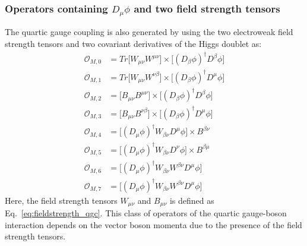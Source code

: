 \subsubsection{Operators containing $D_{\mu}\phi$ and two field strength tensors} %
\label{ssub:operators_containing_}
The quartic gauge coupling is also generated by using the two electroweak field strength tensors and two covariant derivatives of the Higgs doublet as:
\begin{align}
\mathcal{O}_{M,0} &=Tr\Big[W_{\mu\nu}W^{\mu\nu}\Big]\times \Big[(D_{\beta}\phi)^{\dagger}D^{\beta}\phi\Big] \\
\mathcal{O}_{M,1} &=Tr\Big[W_{\mu\nu}W^{\nu\beta}\Big]\times \Big[(D_{\beta}\phi)^{\dagger}D^{\mu}\phi\Big]\\
\mathcal{O}_{M,2} &=\Big[B_{\mu\nu}B^{\mu\nu}\Big]\times \Big[(D_{\beta}\phi)^{\dagger}D^{\beta}\phi\Big]\\
\mathcal{O}_{M,3} &=\Big[B_{\mu\nu}B^{\nu\beta}\Big]\times \Big[(D_{\beta}\phi)^{\dagger}D^{\mu}\phi\Big]\\
\mathcal{O}_{M,4} &=\Big[(D_{\mu}\phi)^{\dagger}W_{\beta\nu}D^{\mu}\phi\Big]\times B^{\beta\nu}\\
\mathcal{O}_{M,5} &=\Big[(D_{\mu}\phi)^{\dagger}W_{\beta\nu}D^{\nu}\phi\Big]\times B^{\beta\mu}\\
\mathcal{O}_{M,6} &=\Big[(D_{\mu}\phi)^{\dagger}W_{\beta\nu}W^{\beta\nu}D^{\mu}\phi\Big]\\
\mathcal{O}_{M,7} &=\Big[(D_{\mu}\phi)^{\dagger}W_{\beta\nu}W^{\beta\nu}D^{\mu}\phi\Big]
\end{align}
Here, the field strength tensors $W_{\mu \nu}$ and $B_{\mu \nu}$ is defined as Eq.~\ref{eq:fieldstrength_qgc}. This class of operators of the quartic gauge-boson interaction depends on the vector boson momenta due to the presence of the field strength tensors.
\halfblankline
